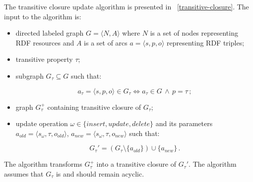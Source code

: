 \documentclass[conference,letterpaper]{IEEEtran}
\begin{document}
The transitive closure update algorithm is presented in
\figurename~\ref{transitive-closure}. The input to the algorithm is:

\begin{itemize}

\item directed labeled graph $G = \langle N, A \rangle$ where $N$ is a
set of nodes representing RDF resources and $A$ is a set of arcs $a =
\langle s, p, o \rangle$ representing RDF triples;

\item transitive property $\tau$;

\item subgraph $G_\tau \subseteq G$ such that:

\begin{equation}
a_\tau = \langle s, p, o \rangle \in G_\tau \iff
a_\tau \in G \, \wedge \, p = \tau \, ;
\end{equation}

\item graph $G_\tau^+$ containing transitive closure of $G_\tau$;

\item update operation $\omega \in \{insert, update, delete\}$ and its
parameters $a_{old} = \langle s_\omega, \tau, o_{old} \rangle$, $a_{new}
= \langle s_\omega, \tau, o_{new} \rangle$ such that:

\begin{equation}
G_\tau' = (G_\tau \setminus \{ a_{old} \}) \cup \{ a_{new} \} \, .
\end{equation}

\end{itemize}

The algorithm transforms $G_\tau^+$ into a transitive closure of
$G_\tau'$. The algorithm assumes that $G_\tau$ is and should remain
acyclic.
\end{document}

